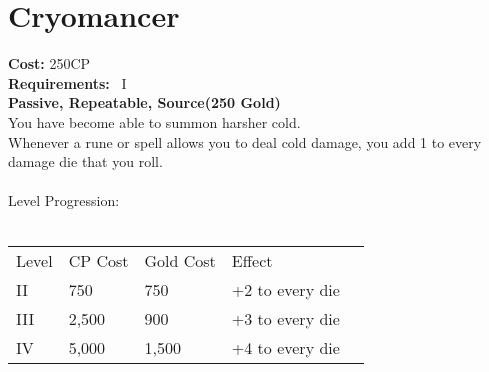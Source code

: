 \section{Cryomancer}\label{perk:cryomancer}
\textbf{Cost:} 250CP\\
\textbf{Requirements:}~ I\\
\textbf{Passive, Repeatable, Source(250 Gold)}\\
You have become able to summon harsher cold.\\
Whenever a rune or spell allows you to deal cold damage, you add 1 to every damage die that you roll.\\
\\
Level Progression:\\
\\
\begin{tabular}{l | l | l | l | l}
    Level & CP Cost & Gold Cost &  Effect\\
    II & 750 & 750 & +2 to every die\\
    III & 2,500 & 900 & +3 to every die\\
    IV & 5,000 & 1,500 & +4 to every die\\
\end{tabular}